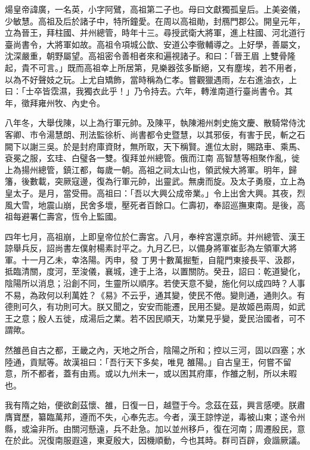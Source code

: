 
\begin{pinyinscope}

 煬皇帝諱廣，一名英，小字阿鷿，高祖第二子也。母曰文獻獨孤皇后。上美姿儀，少敏慧。高祖及后於諸子中，特所鐘愛。在周以高祖勛，封鴈門郡公。開皇元年，立為晉王，拜柱國、并州總管，時年十三。尋授武衛大將軍，進上柱國、河北道行臺尚書令，大將軍如故。高祖令項城公歆、安道公李徹輔導之。上好學，善屬文，沈深嚴重，朝野屬望。高祖密令善相者來和遍視諸子。和曰：「晉王眉
 上雙骨隆起，貴不可言。」既而高祖幸上所居第，見樂器弦多斷絕，又有塵埃，若不用者，以為不好聲妓之玩。上尤自矯飾，當時稱為仁孝。嘗觀獵遇雨，左右進油衣，上曰：「士卒皆霑濕，我獨衣此乎！」乃令持去。六年，轉淮南道行臺尚書令。其年，徵拜雍州牧、內史令。



 八年冬，大舉伐陳，以上為行軍元帥。及陳平，執陳湘州刺史施文慶、散騎常侍沈客卿、市令湯慧朗、刑法監徐析、尚書都令史暨慧，以其邪佞，有害于民，斬之石闕下以謝三吳。於是封府庫資財，無所取，天下稱賢。進位太尉，賜路車、乘馬、袞冕之服，玄珪、白璧各一雙。復拜並州總管。俄而江南
 高智慧等相聚作亂，徙上為揚州總管，鎮江都，每歲一朝。高祖之祠太山也，領武候大將軍。明年，歸籓，後數載，突厥寇邊，復為行軍元帥，出靈武。無虜而旋。及太子勇廢，立上為皇太子。是月，當受冊。高祖曰：「吾以大興公成帝業。」令上出舍大興。其夜，烈風大雪，地震山崩，民舍多壞，壓死者百餘口。仁壽初，奉詔巡撫東南。是後，高祖每避署仁壽宮，恆令上監國。



 四年七月，高祖崩，上即皇帝位於仁壽宮。八月，奉梓宮還京師。并州總管、漢王諒舉兵反，詔尚書左僕射楊素討平之。九月乙巳，以備身將軍崔彭為左領軍大將軍。十一月乙未，幸洛陽。丙申，發
 丁男十數萬掘塹，自龍門東接長平、汲郡，抵臨清關，度河，至浚儀，襄城，達于上洛，以置關防。癸丑，詔曰：乾道變化，陰陽所以消息；沿創不同，生靈所以順序。若使天意不變，施化何以成四時？人事不易，為政何以利萬姓？《易》不云乎，通其變，使民不倦。變則通，通則久。有德則可久，有功則可大。朕又聞之，安安而能遷，民用丕變。是故姬邑兩周，如武王之意；殷人五徙，成湯后之業。若不因民順天，功業見乎變，愛民治國者，可不謂歟。



 然雒邑自古之都，王畿之內，天地之所合，陰陽之所和；控以三河，固以四塞；水陸通，貢賦等。故漢祖曰：「吾行天下多矣，唯見
 雒陽。」自古皇王，何嘗不留意，所不都者，蓋有由焉。或以九州未一，或以困其府庫，作雒之制，所以未暇也。



 我有隋之始，便欲創茲懷、雒，日復一日，越暨于今。念茲在茲，興言感哽。朕肅膺寶歷，纂臨萬邦，遵而不失，心奉先志。今者，漢王諒悖逆，毒被山東；遂令州縣，或淪非所。由關河懸遠，兵不赴急。加以並州移戶，復在河南；周遷殷民，意在於此。況復南服遐遠，東夏殷大，因機順動，今也其時。群司百辟，僉諧厥議。




\end{pinyinscope}
